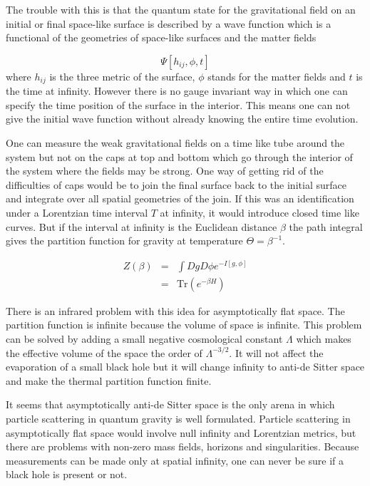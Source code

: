 \documentclass[aps,prd,groupedaddress,showpacs,12pt]{revtex4-1}
\begin{document}
The trouble with this is that the quantum state for the gravitational field on an initial or final space-like surface is described by a wave function which is a functional of the geometries of space-like surfaces and the matter fields 

\begin{equation}
\Psi[h_{ij}, \phi, t]
\end{equation}
where $h_{ij}$ is the three metric of the surface, $\phi$ stands for the matter fields and $t$ is the time at infinity. 
However there is no gauge invariant way in which one can specify the time position of the surface in the interior. This means one can not give the initial wave function without already knowing the entire time evolution. 

One can measure the weak gravitational fields on a time like tube around the system but not on the caps at top and bottom which go through the interior of the system where the fields may be strong. One way of getting rid of the difficulties of caps would be to join the final surface back to the initial surface and integrate over all spatial geometries of the join.   If this was an identification under a Lorentzian time interval $T$ at infinity, it would introduce closed time like curves. But if the interval at infinity is the Euclidean  distance $\beta$ the path integral gives the partition function for gravity at temperature $\Theta=\beta^{-1}$.  

\begin{eqnarray}
Z(\beta)&=&\int DgD\phi e^{-I[g, \phi]}\nonumber \\
&=&\text{Tr}(e^{-\beta H})
\end{eqnarray}


There is an infrared problem with this idea for asymptotically flat space.  The partition function is infinite because the volume of space is infinite. This problem can be solved by adding a small negative cosmological constant $\Lambda$ which makes the effective volume of the space the order of $\Lambda^{-3/2}$. It will not affect the evaporation of a small black hole but it will change infinity to anti-de Sitter space and make the thermal partition function finite.

It seems that asymptotically anti-de Sitter space is the only arena in which particle scattering in quantum gravity is well formulated. Particle scattering in asymptotically flat space would involve null infinity and Lorentzian metrics, but there are problems with non-zero mass fields, horizons and singularities. Because measurements can be made only at spatial infinity, one can never be sure if a black hole is present or not. 
\end{document}
